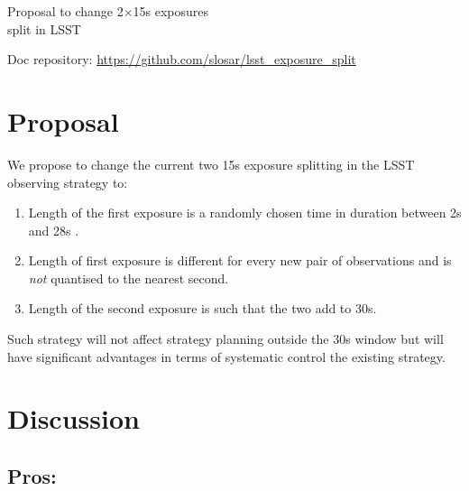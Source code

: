 \documentclass[12pt, a4paper]{article}
\begin{document}
\begin{center}
{\Huge
  Proposal to change 2$\times$15s exposures\\ split in
  LSST
}
\end{center}



{\small
Doc repository: \url{https://github.com/slosar/lsst_exposure_split}
}

\section*{Proposal}

We propose to change the current two 15s exposure splitting in the
LSST observing strategy to:

\begin{enumerate}
\item Length of the first exposure is a randomly chosen time in
  duration between 2s and 28s .

\item Length of first exposure is different for every new pair of
  observations and is \emph{not} quantised to the nearest second.

\item Length of the second exposure is such that the two add to 30s.
\end{enumerate}

Such strategy will not affect strategy planning outside the 30s window
but will have significant advantages in terms of systematic control
the existing strategy.



\section*{Discussion}


\subsection*{Pros:}
\end{document}
